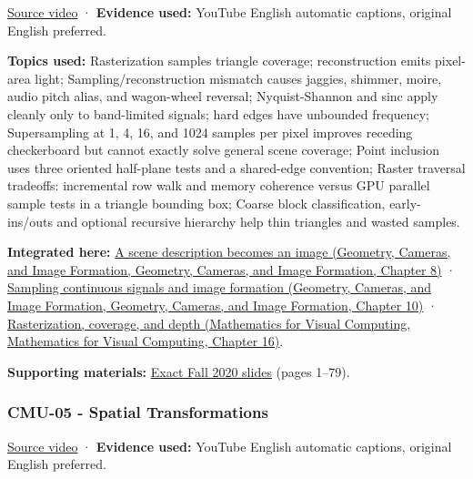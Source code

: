 \href{https://www.youtube.com/watch?v=B0hsT2npIc0}{Source video} · \textbf{Evidence used:} YouTube English automatic captions, original English preferred.

\textbf{Topics used:} Rasterization samples triangle coverage; reconstruction emits pixel-area light; Sampling/reconstruction mismatch causes jaggies, shimmer, moire, audio pitch alias, and wagon-wheel reversal; Nyquist-Shannon and sinc apply cleanly only to band-limited signals; hard edges have unbounded frequency; Supersampling at 1, 4, 16, and 1024 samples per pixel improves receding checkerboard but cannot exactly solve general scene coverage; Point inclusion uses three oriented half-plane tests and a shared-edge convention; Raster traversal tradeoffs: incremental row walk and memory coherence versus GPU parallel sample tests in a triangle bounding box; Coarse block classification, early-ins/outs and optional recursive hierarchy help thin triangles and wasted samples.

\textbf{Integrated here:} \href{../03-Geometry-Cameras-and-Image-Formation/main.pdf\#nameddest=03-visual-computing-i-ch001-a-scene-description-becomes-an-image}{A scene description becomes an image (Geometry, Cameras, and Image Formation, Geometry, Cameras, and Image Formation, Chapter 8)} · \href{../03-Geometry-Cameras-and-Image-Formation/main.pdf\#nameddest=03-visual-computing-i-ch003-sampling-continuous-signals-and-image-formation}{Sampling continuous signals and image formation (Geometry, Cameras, and Image Formation, Geometry, Cameras, and Image Formation, Chapter 10)} · \href{../02-Mathematics-for-Visual-Computing/main.pdf\#nameddest=03-visual-computing-i-ch012-rasterization-coverage-and-depth}{Rasterization, coverage, and depth (Mathematics for Visual Computing, Mathematics for Visual Computing, Chapter 16)}.

\textbf{Supporting materials:} \href{https://15462.courses.cs.cmu.edu/fall2020content/lectures/04_drawingatriangle/04_drawingatriangle_slides.pdf}{Exact Fall 2020 slides} (pages 1--79).

\subsubsection{CMU-05 - Spatial Transformations}\label{04-visual-computing-ii-ch036-cmu-05---spatial-transformations}

\href{https://www.youtube.com/watch?v=QmFBHSJS0Gw}{Source video} · \textbf{Evidence used:} YouTube English automatic captions, original English preferred.

